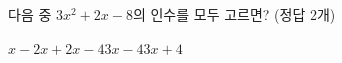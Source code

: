 다음 중 $3x^2+2x-8$의 인수를 모두 고르면? (정답 2개)
\begin{choices32}{$x-2$}{$x+2$}{$x-4$}{$3x-4$}{$3x+4$}\end{choices32}
